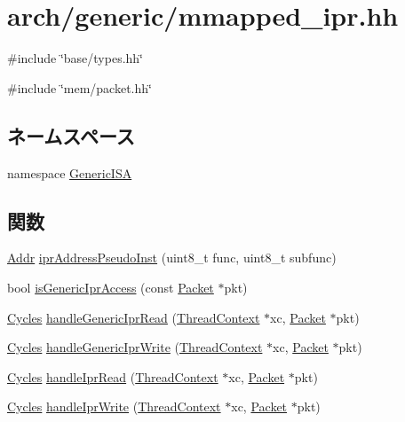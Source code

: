 \hypertarget{generic_2mmapped__ipr_8hh}{
\section{arch/generic/mmapped\_\-ipr.hh}
\label{generic_2mmapped__ipr_8hh}
}
{\ttfamily \#include \char`\"{}base/types.hh\char`\"{}}\par
{\ttfamily \#include \char`\"{}mem/packet.hh\char`\"{}}\par
\subsection*{ネームスペース}
\begin{DoxyCompactItemize}
\item 
namespace \hyperlink{namespaceGenericISA}{GenericISA}
\end{DoxyCompactItemize}
\subsection*{関数}
\begin{DoxyCompactItemize}
\item 
\hyperlink{base_2types_8hh_af1bb03d6a4ee096394a6749f0a169232}{Addr} \hyperlink{namespaceGenericISA_a79a8335aadefb64d22e7fc06ac063ad0}{iprAddressPseudoInst} (uint8\_\-t func, uint8\_\-t subfunc)
\item 
bool \hyperlink{namespaceGenericISA_a5570d3282731abc7bd1318962834300e}{isGenericIprAccess} (const \hyperlink{classPacket}{Packet} $\ast$pkt)
\item 
\hyperlink{classCycles}{Cycles} \hyperlink{namespaceGenericISA_ac1de480955fd7b1b8b658e4faaece886}{handleGenericIprRead} (\hyperlink{classThreadContext}{ThreadContext} $\ast$xc, \hyperlink{classPacket}{Packet} $\ast$pkt)
\item 
\hyperlink{classCycles}{Cycles} \hyperlink{namespaceGenericISA_a1412c2f2794674f9be65d92b5b0f0b18}{handleGenericIprWrite} (\hyperlink{classThreadContext}{ThreadContext} $\ast$xc, \hyperlink{classPacket}{Packet} $\ast$pkt)
\item 
\hyperlink{classCycles}{Cycles} \hyperlink{namespaceGenericISA_a0b95fcdc1e1fe57dbb4fcad449a6efd8}{handleIprRead} (\hyperlink{classThreadContext}{ThreadContext} $\ast$xc, \hyperlink{classPacket}{Packet} $\ast$pkt)
\item 
\hyperlink{classCycles}{Cycles} \hyperlink{namespaceGenericISA_a31c83a2af3232333d9a399a2878dc729}{handleIprWrite} (\hyperlink{classThreadContext}{ThreadContext} $\ast$xc, \hyperlink{classPacket}{Packet} $\ast$pkt)
\end{DoxyCompactItemize}
